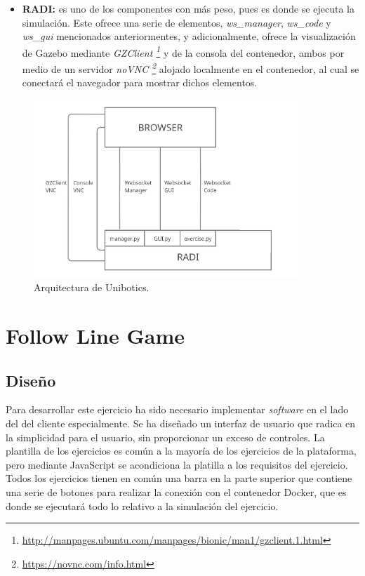 \documentclass[a4paper, 12pt]{book}
\begin{document}
\begin{itemize}
\item \textbf{RADI:} es uno de los componentes con más peso, pues es donde se ejecuta la simulación. Este ofrece una serie de elementos,  \emph{ws\_manager}, \emph{ws\_code} y \emph{ws\_gui} mencionados anteriormentes, y adicionalmente, ofrece la visualización de Gazebo mediante \emph{GZClient \footnote{\url{http://manpages.ubuntu.com/manpages/bionic/man1/gzclient.1.html}}} y de la consola del contenedor, ambos por medio de un servidor \emph{noVNC \footnote{\url{https://novnc.com/info.html}}} alojado localmente en el contenedor, al cual se conectará el navegador para mostrar dichos elementos.
\end{itemize}

\begin{figure}[H]
	\centering
    \includegraphics[width=10cm]{img/robotics_academy_architecture.png}
    \caption{Arquitectura de Unibotics.}
    \label{figura:unibotics_architecture}
\end{figure}

\section{Follow Line Game} 
\label{sec:follow_line_game}

\subsection{Diseño}
\label{subsec:follow_line_game_diseño}

Para desarrollar este ejercicio ha sido necesario implementar \emph{software}  en el lado del del cliente especialmente. Se ha diseñado un interfaz de usuario que radica en la simplicidad para el usuario, sin proporcionar un exceso de controles. La plantilla de los ejercicios es común a la mayoría de los ejercicios de la plataforma, pero mediante JavaScript se acondiciona la platilla a los requisitos del ejercicio. Todos los ejercicios tienen en común una barra en la parte superior que contiene una serie de botones para realizar la conexión con el contenedor Docker, que es donde se ejecutará todo lo relativo a la simulación del ejercicio.
\end{document}
